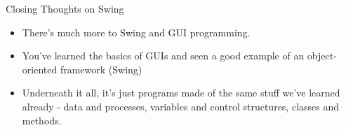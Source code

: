 \documentclass{beamer}
\begin{document}
\begin{frame}[fragile]{Closing Thoughts on Swing}


\begin{itemize}
\item There's much more to Swing and GUI programming.
\item You've learned the basics of GUIs and seen a good example of an object-oriented framework (Swing)
\item Underneath it all, it's just programs made of the same stuff we've learned already - data and processes, variables and control structures, classes and methods.

\end{itemize}


\end{frame}









\end{document}
